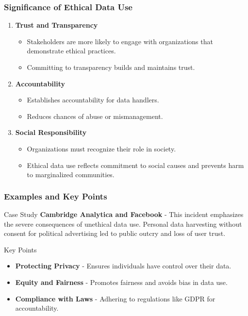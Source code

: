 \documentclass[aspectratio=169]{beamer}
\begin{document}
\begin{frame}[fragile]
    \frametitle{Significance of Ethical Data Use}
    \begin{enumerate}
        \item \textbf{Trust and Transparency}
            \begin{itemize}
                \item Stakeholders are more likely to engage with organizations that demonstrate ethical practices.
                \item Committing to transparency builds and maintains trust.
            \end{itemize}
        
        \item \textbf{Accountability}
            \begin{itemize}
                \item Establishes accountability for data handlers.
                \item Reduces chances of abuse or mismanagement.
            \end{itemize}
        
        \item \textbf{Social Responsibility}
            \begin{itemize}
                \item Organizations must recognize their role in society.
                \item Ethical data use reflects commitment to social causes and prevents harm to marginalized communities.
            \end{itemize}
    \end{enumerate}
\end{frame}

\begin{frame}[fragile]
    \frametitle{Examples and Key Points}
    \begin{block}{Case Study}
        \textbf{Cambridge Analytica and Facebook} - This incident emphasizes the severe consequences of unethical data use.
        Personal data harvesting without consent for political advertising led to public outcry and loss of user trust.
    \end{block}
    
    \begin{block}{Key Points}
        \begin{itemize}
            \item \textbf{Protecting Privacy} - Ensures individuals have control over their data.
            \item \textbf{Equity and Fairness} - Promotes fairness and avoids bias in data use.
            \item \textbf{Compliance with Laws} - Adhering to regulations like GDPR for accountability.
        \end{itemize}
    \end{block}
\end{frame}
\end{document}
